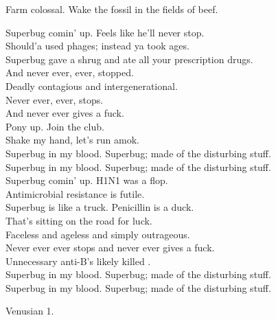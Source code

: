 Farm colossal. Wake the fossil in the fields of beef. \\




Superbug comin' up. Feels like he'll never stop. \\
Should'a used phages; instead ya took ages. \\
Superbug gave a shrug and ate all your prescription drugs. \\
And never ever, ever, stopped. \\
Deadly contagious and intergenerational. \\
Never ever, ever, stops. \\
And never ever gives a fuck. \\

Pony up. Join the club. \\
Shake my hand, let's run amok. \\

Superbug in my blood. Superbug; made of the disturbing stuff. \\
Superbug in my blood. Superbug; made of the disturbing stuff. \\

Superbug comin' up. H1N1 was a flop. \\
Antimicrobial resistance is futile. \\
Superbug is like a truck. Penicillin is a duck. \\
That's sitting on the road for luck. \\
Faceless and ageless and simply outrageous. \\
Never ever ever stops and never ever gives a fuck. \\

Unnecessary anti-B's likely killed . \\

Superbug in my blood. Superbug; made of the disturbing stuff. \\
Superbug in my blood. Superbug; made of the disturbing stuff. \\




Venusian 1. \\

